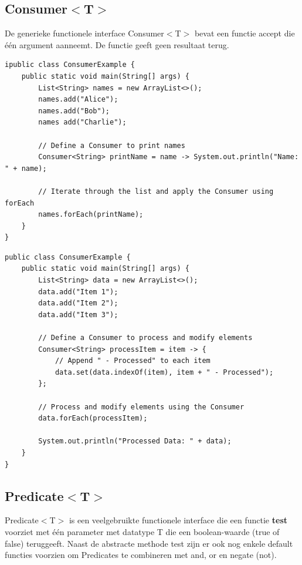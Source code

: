 \subsection{Consumer$<$T$>$}

De generieke functionele interface Consumer$<$T$>$ bevat een functie accept die \'e\'en argument aanneemt. De functie geeft geen resultaat terug. 

\begin{lstlisting}
ipublic class ConsumerExample {
    public static void main(String[] args) {
        List<String> names = new ArrayList<>();
        names.add("Alice");
        names.add("Bob");
        names add("Charlie");
        
        // Define a Consumer to print names
        Consumer<String> printName = name -> System.out.println("Name: " + name);
        
        // Iterate through the list and apply the Consumer using forEach
        names.forEach(printName);
    }
}
\end{lstlisting}

\begin{lstlisting}
public class ConsumerExample {
    public static void main(String[] args) {
        List<String> data = new ArrayList<>();
        data.add("Item 1");
        data.add("Item 2");
        data.add("Item 3");
        
        // Define a Consumer to process and modify elements
        Consumer<String> processItem = item -> {
            // Append " - Processed" to each item
            data.set(data.indexOf(item), item + " - Processed");
        };
        
        // Process and modify elements using the Consumer
        data.forEach(processItem);
        
        System.out.println("Processed Data: " + data);
    }
}
\end{lstlisting}


\subsection{Predicate$<$T$>$}

Predicate$<$T$>$ is een veelgebruikte functionele interface die een functie \textbf{test} voorziet met \'e\'en parameter met datatype T die een boolean-waarde (true of false) teruggeeft. Naast de abstracte methode test zijn er ook nog enkele default functies voorzien om Predicates te combineren met and, or en negate (not).

